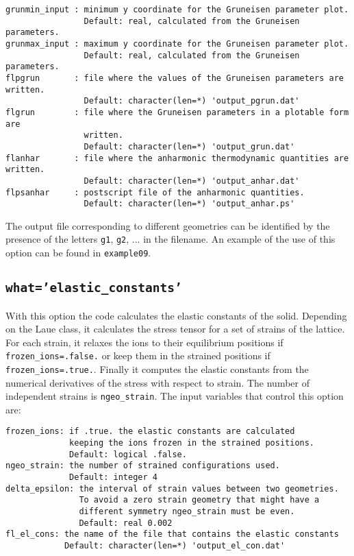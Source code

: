 \documentclass[12pt,a4paper]{article}
\begin{document}
\begin{verbatim}
grunmin_input : minimum y coordinate for the Gruneisen parameter plot.
                Default: real, calculated from the Gruneisen parameters.
grunmax_input : maximum y coordinate for the Gruneisen parameter plot.
                Default: real, calculated from the Gruneisen parameters.
flpgrun       : file where the values of the Gruneisen parameters are written. 
                Default: character(len=*) 'output_pgrun.dat'
flgrun        : file where the Gruneisen parameters in a plotable form are
                written.
                Default: character(len=*) 'output_grun.dat'
flanhar       : file where the anharmonic thermodynamic quantities are written.
                Default: character(len=*) 'output_anhar.dat'
flpsanhar     : postscript file of the anharmonic quantities.
                Default: character(len=*) 'output_anhar.ps'
\end{verbatim}
The output file corresponding to different geometries can be identified
by the presence of the letters \texttt{g1}, \texttt{g2}, ... in the filename.
An example of the use of this option can be found in \texttt{example09}.

\subsection{\texttt{what='elastic\_constants'}}
With this option the code calculates the elastic constants of the solid.
Depending on the Laue class, it calculates the stress tensor for a set of 
strains of the lattice. For each strain, it relaxes the ions to their 
equilibrium positions if \texttt{frozen\_ions=.false.} or keep them
in the strained positions if \texttt{frozen\_ions=.true.}. 
Finally it computes the elastic constants from the numerical derivatives 
of the stress with respect to strain.
The number of independent strains is \texttt{ngeo\_strain}. The input variables
that control this option are:
\begin{verbatim}
frozen_ions: if .true. the elastic constants are calculated 
             keeping the ions frozen in the strained positions. 
             Default: logical .false.
ngeo_strain: the number of strained configurations used. 
             Default: integer 4
delta_epsilon: the interval of strain values between two geometries.
               To avoid a zero strain geometry that might have a
               different symmetry ngeo_strain must be even.
               Default: real 0.002
fl_el_cons: the name of the file that contains the elastic constants
            Default: character(len=*) 'output_el_con.dat'

\end{verbatim}
\end{document}
